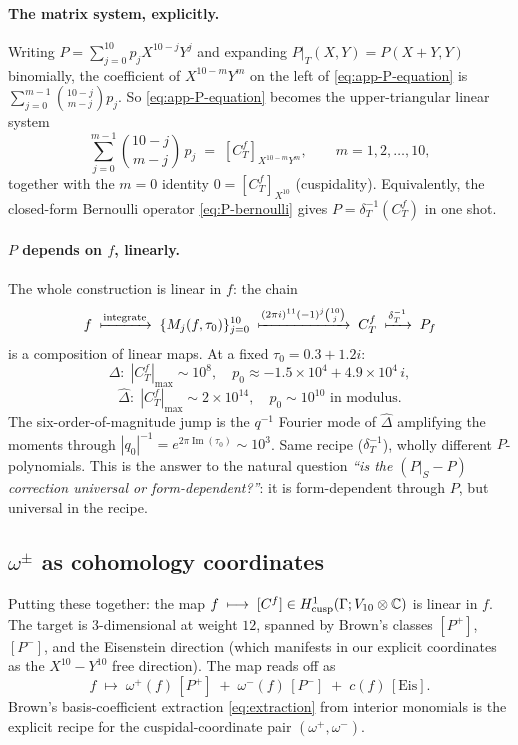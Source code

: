 \documentclass[11pt,letterpaper]{article}
\newcommand{\CC}{\mathbb{C}}
\DeclareMathOperator{\im}{Im}
\begin{document}
\paragraph{The matrix system, explicitly.}
Writing $P = \sum_{j=0}^{10} p_j X^{10-j}Y^j$ and expanding $P|_T(X,Y) = P(X+Y, Y)$
binomially, the coefficient of $X^{10-m}Y^m$ on the left of \eqref{eq:app-P-equation}
is $\sum_{j=0}^{m-1}\binom{10-j}{m-j}p_j$.  So \eqref{eq:app-P-equation} becomes
the upper-triangular linear system
\begin{equation}\label{eq:app-system}
  \sum_{j=0}^{m-1} \binom{10-j}{m-j}\,p_j \;=\; [C^f_T]_{X^{10-m}Y^m},
  \qquad m = 1, 2, \ldots, 10,
\end{equation}
together with the $m=0$ identity $0 = [C^f_T]_{X^{10}}$ (cuspidality).
Equivalently, the closed-form Bernoulli operator \eqref{eq:P-bernoulli}
gives $P = \delta_T^{-1}(C^f_T)$ in one shot.

\paragraph{$P$ depends on $f$, linearly.}
The whole construction is linear in $f$: the chain
\[
  f \;\xmapsto{\text{integrate}}\; \{M_j(f,\tau_0)\}_{j=0}^{10}
   \;\xmapsto{(2\pi i)^{11}(-1)^j\binom{10}{j}}\; C^f_T
   \;\xmapsto{\delta_T^{-1}}\; P_f
\]
is a composition of linear maps.  At a fixed $\tau_0 = 0.3+1.2i$:
\[
  \Delta \colon \;|C^f_T|_\text{max} \sim 10^8, \quad p_0 \approx -1.5\times 10^4 + 4.9\times 10^4\,i,
\]
\[
  \widehat\Delta \colon \;|C^f_T|_\text{max} \sim 2\times 10^{14},
                       \quad p_0 \sim 10^{10}\text{ in modulus}.
\]
The six-order-of-magnitude jump is the $q^{-1}$ Fourier mode of $\widehat\Delta$
amplifying the moments through $|q_0|^{-1} = e^{2\pi\im(\tau_0)} \sim 10^3$.
Same recipe ($\delta_T^{-1}$), wholly different $P$-polynomials.  This is
the answer to the natural question \emph{``is the $(P|_S - P)$ correction
universal or form-dependent?''}: it is form-dependent through $P$, but
universal in the recipe.

\subsection{$\omega^\pm$ as cohomology coordinates}\label{app:cohom-coords}

Putting these together: the map
\(
  f \;\longmapsto\; [C^f] \in H^1_{\rm cusp}(\Gamma; V_{10}\otimes\CC)
\)
is linear in $f$.  The target is $3$-dimensional at weight $12$, spanned by
Brown's classes $[P^+]$, $[P^-]$, and the Eisenstein direction (which
manifests in our explicit coordinates as the $X^{10}-Y^{10}$ free
direction).  The map reads off as
\[
  f \;\longmapsto\; \omega^+(f)\,[P^+] \;+\; \omega^-(f)\,[P^-] \;+\; c(f)\,[\text{Eis}].
\]
Brown's basis-coefficient extraction \eqref{eq:extraction} from interior
monomials is the explicit recipe for the cuspidal-coordinate pair
$(\omega^+, \omega^-)$.
\end{document}
